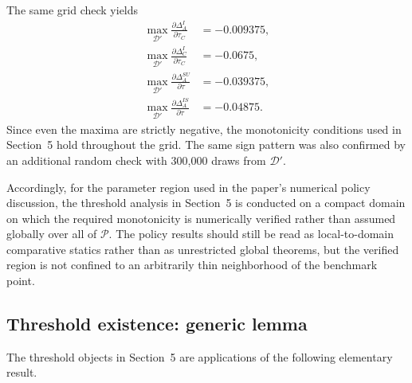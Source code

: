 The same grid check yields
\begin{align}
\max_{\mathcal D'}\frac{\partial \Delta_A^I}{\partial \tau_C}
&= -0.009375, \label{eq:D_dAI_max}\\
\max_{\mathcal D'}\frac{\partial \Delta_C^I}{\partial \tau_C}
&= -0.0675, \label{eq:D_dCI_max}\\
\max_{\mathcal D'}\frac{\partial \Delta_A^{SU}}{\partial \tau}
&= -0.039375, \label{eq:D_dASU_max}\\
\max_{\mathcal D'}\frac{\partial \Delta_A^{IS}}{\partial \tau}
&= -0.04875. \label{eq:D_dAIS_max}
\end{align}
Since even the maxima are strictly negative, the monotonicity conditions used
in Section~5 hold throughout the grid. The same sign pattern was also
confirmed by an additional random check with 300{,}000 draws from
$\mathcal D'$.

Accordingly, for the parameter region used in the paper's numerical policy
discussion, the threshold analysis in Section~5 is conducted on a compact
domain on which the required monotonicity is numerically verified rather than
assumed globally over all of $\mathcal P$. The policy results should still be
read as local-to-domain comparative statics rather than as unrestricted global
theorems, but the verified region is not confined to an arbitrarily thin
neighborhood of the benchmark point.

\subsection{Threshold existence: generic lemma}

The threshold objects in Section~5 are applications of the following
elementary result.

